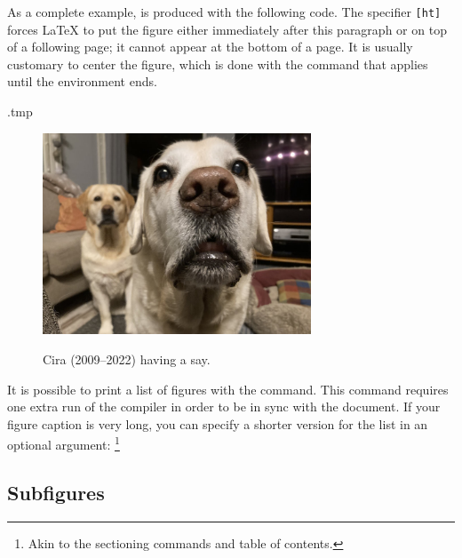 As a complete example,  is produced with the following code.
The specifier \verb|[ht]| forces \LaTeX{} to put the figure either immediately
after this paragraph or on top of a following page; it cannot appear at the bottom of a page.
It is usually customary to center the figure,
which is done with the  command that applies until the environment ends.%
\label{ex:alt text}
%
\begin{VerbatimOut}{\jobname.tmp}
\begin{figure}[ht]
\centering
\includegraphics[width=8cm,
  alt={An old labrador retriever close up,
    with intense gaze and mouth slightly open.
    In the background, a younger labrador also stares at the camera.}]
  {pictures/TheDogs.jpg}
\caption{Cira (2009--2022) having a say.}
\label{fig:cira}
\end{figure}

\end{VerbatimOut}
\ExecuteExample

It is possible to print a list of figures
with the  command.
This command requires one extra run of the compiler in order to be in sync with the document.
If your figure caption is very long,
you can specify a shorter version for the list in an optional argument:%
\footnote{Akin to the sectioning commands and table of contents.}
\begin{ExampleCode}
\caption[An old labrador]{Cira (2009--2022) having a say.}
\end{ExampleCode}


%
%
\subsection{Subfigures}\label{sec:subfigures}

